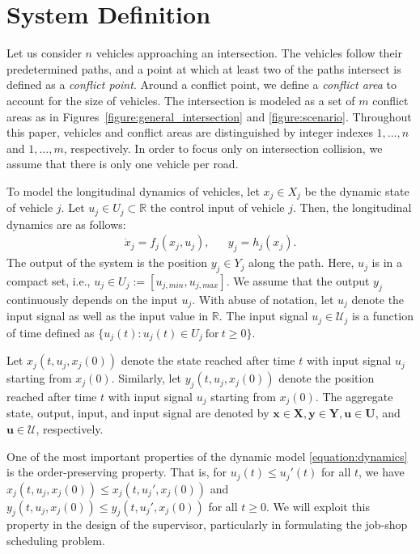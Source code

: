 \documentclass{sig-alternate}
\begin{document}
\section{System Definition}\label{section:system_definition}

Let us consider $n$ vehicles approaching an intersection. The vehicles follow their predetermined paths, and a point at which at least two of the paths intersect is defined as a \textit{conflict point}. Around a conflict point, we define a \textit{conflict area} to account for the size of vehicles. The intersection is modeled as a set of $m$ conflict areas as in Figures~\ref{figure:general_intersection} and \ref{figure:scenario}. Throughout this paper, vehicles and conflict areas are distinguished by integer indexes $1,\ldots, n$ and $1,\dots,m$, respectively. In order to focus only on intersection collision, we assume that there is only one vehicle per road. 

To model the longitudinal dynamics of vehicles, let $x_j\in X_j$ be the dynamic state of vehicle $j$. Let $u_j\in U_j\subset \mathbb{R}$ the control input of vehicle $j$. Then, the longitudinal dynamics are as follows:
\begin{align}\label{equation:dynamics}
\dot{x}_j=f_j(x_j,u_j), && y_j=h_j(x_j).
\end{align}
The output of the system is the position $y_j\in Y_j$ along the path. Here, $u_j$ is in a compact set, i.e., $u_j\in U_j:=[u_{j,min}, u_{j,max}]$. We assume that the output $y_j$ continuously depends on the input $u_j$. With abuse of notation, let $u_j$ denote the input signal as well as the input value in $\mathbb{R}$. The input signal $u_j\in\mathcal{U}_j$ is a function of time defined as $\{u_j(t): u_j(t)\in U_j~\text{for}~t\geq 0\}$.  

Let $x_j(t,u_j,x_j(0))$ denote the state reached after time $t$ with input signal $u_j$ starting from $x_j(0)$. Similarly, let $y_j(t,u_j,x_j(0))$ denote the position reached after time $t$ with input signal $u_j$ starting from $x_j(0)$. The aggregate state, output, input, and input signal are denoted by $\mathbf{x}\in\mathbf{X}, \mathbf{y}\in\mathbf{Y},\mathbf{u}\in\mathbf{U}$, and $\mathbf{u}\in\mathbf{\mathcal{U}}$, respectively.

One of the most important properties of the dynamic model \eqref{equation:dynamics} is the order-preserving property. That is, for $u_j(t)\leq u_j'(t)$ for all $t$, we have $x_j(t,u_j,x_j(0))\leq x_j(t,u_j',x_j(0))$ and $y_j(t,u_j,x_j(0))\leq y_j(t,u_j',x_j(0))$ for all $t\geq 0$. We will exploit this property in the design of the supervisor, particularly in formulating the job-shop scheduling problem.
	
\end{document}
